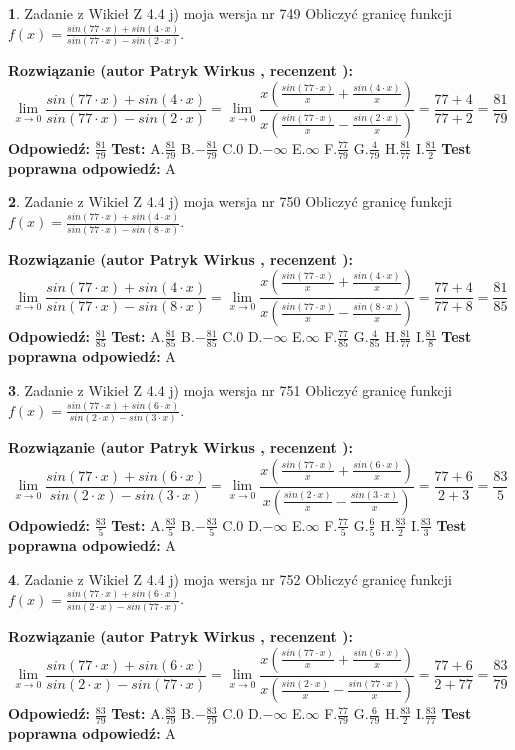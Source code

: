 \documentclass[12pt, a4paper]{article}
\theoremstyle{definition} %
\newtheorem{zad}{}
\newcommand{\zadStart}[1]{\begin{zad}#1\newline}
\newcommand{\zadStop}{\end{zad}}
\newcommand{\rozwStart}[2]{\noindent \textbf{Rozwiązanie (autor #1 , recenzent #2): }\newline}
\newcommand{\rozwStop}{\newline}
\newcommand{\odpStart}{\noindent \textbf{Odpowiedź:}\newline}
\newcommand{\odpStop}{\newline}
\newcommand{\testStart}{\noindent \textbf{Test:}\newline}
\newcommand{\testStop}{\newline}
\newcommand{\kluczStart}{\noindent \textbf{Test poprawna odpowiedź:}\newline}
\newcommand{\kluczStop}{\newline}
\begin{document}
\zadStart{Zadanie z Wikieł Z 4.4 j) moja wersja nr 749}
Obliczyć granicę funkcji $f(x)=\frac{sin(77\cdot x) +sin(4\cdot x)}{sin(77\cdot x) -sin(2\cdot x)}$.
\zadStop
\rozwStart{Patryk Wirkus}{}
$$\lim\limits_{x\to 0}\frac{sin(77\cdot x) +sin(4\cdot x)}{sin(77\cdot x) -sin(2\cdot x)}=\lim\limits_{x\to 0}\frac{x(\frac{sin(77\cdot x)}{x}+\frac{sin(4\cdot x)}{x})}{x(\frac{sin(77\cdot x)}{x}-\frac{sin(2\cdot x)}{x})}=\frac{77+4}{77+2} = \frac{81}{79}$$
\rozwStop
\odpStart
$\frac{81}{79}$
\odpStop
\testStart
A.$\frac{81}{79}$
B.$-\frac{81}{79}$
C.$0$
D.$-\infty$
E.$\infty$
F.$\frac{77}{79}$
G.$\frac{4}{79}$
H.$\frac{81}{77}$
I.$\frac{81}{2}$
\testStop
\kluczStart
A
\kluczStop



\zadStart{Zadanie z Wikieł Z 4.4 j) moja wersja nr 750}
Obliczyć granicę funkcji $f(x)=\frac{sin(77\cdot x) +sin(4\cdot x)}{sin(77\cdot x) -sin(8\cdot x)}$.
\zadStop
\rozwStart{Patryk Wirkus}{}
$$\lim\limits_{x\to 0}\frac{sin(77\cdot x) +sin(4\cdot x)}{sin(77\cdot x) -sin(8\cdot x)}=\lim\limits_{x\to 0}\frac{x(\frac{sin(77\cdot x)}{x}+\frac{sin(4\cdot x)}{x})}{x(\frac{sin(77\cdot x)}{x}-\frac{sin(8\cdot x)}{x})}=\frac{77+4}{77+8} = \frac{81}{85}$$
\rozwStop
\odpStart
$\frac{81}{85}$
\odpStop
\testStart
A.$\frac{81}{85}$
B.$-\frac{81}{85}$
C.$0$
D.$-\infty$
E.$\infty$
F.$\frac{77}{85}$
G.$\frac{4}{85}$
H.$\frac{81}{77}$
I.$\frac{81}{8}$
\testStop
\kluczStart
A
\kluczStop



\zadStart{Zadanie z Wikieł Z 4.4 j) moja wersja nr 751}
Obliczyć granicę funkcji $f(x)=\frac{sin(77\cdot x) +sin(6\cdot x)}{sin(2\cdot x) -sin(3\cdot x)}$.
\zadStop
\rozwStart{Patryk Wirkus}{}
$$\lim\limits_{x\to 0}\frac{sin(77\cdot x) +sin(6\cdot x)}{sin(2\cdot x) -sin(3\cdot x)}=\lim\limits_{x\to 0}\frac{x(\frac{sin(77\cdot x)}{x}+\frac{sin(6\cdot x)}{x})}{x(\frac{sin(2\cdot x)}{x}-\frac{sin(3\cdot x)}{x})}=\frac{77+6}{2+3} = \frac{83}{5}$$
\rozwStop
\odpStart
$\frac{83}{5}$
\odpStop
\testStart
A.$\frac{83}{5}$
B.$-\frac{83}{5}$
C.$0$
D.$-\infty$
E.$\infty$
F.$\frac{77}{5}$
G.$\frac{6}{5}$
H.$\frac{83}{2}$
I.$\frac{83}{3}$
\testStop
\kluczStart
A
\kluczStop



\zadStart{Zadanie z Wikieł Z 4.4 j) moja wersja nr 752}
Obliczyć granicę funkcji $f(x)=\frac{sin(77\cdot x) +sin(6\cdot x)}{sin(2\cdot x) -sin(77\cdot x)}$.
\zadStop
\rozwStart{Patryk Wirkus}{}
$$\lim\limits_{x\to 0}\frac{sin(77\cdot x) +sin(6\cdot x)}{sin(2\cdot x) -sin(77\cdot x)}=\lim\limits_{x\to 0}\frac{x(\frac{sin(77\cdot x)}{x}+\frac{sin(6\cdot x)}{x})}{x(\frac{sin(2\cdot x)}{x}-\frac{sin(77\cdot x)}{x})}=\frac{77+6}{2+77} = \frac{83}{79}$$
\rozwStop
\odpStart
$\frac{83}{79}$
\odpStop
\testStart
A.$\frac{83}{79}$
B.$-\frac{83}{79}$
C.$0$
D.$-\infty$
E.$\infty$
F.$\frac{77}{79}$
G.$\frac{6}{79}$
H.$\frac{83}{2}$
I.$\frac{83}{77}$
\testStop
\kluczStart
A
\kluczStop
\end{document}
